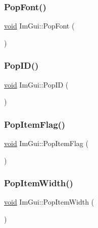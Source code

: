 \mbox{\label{namespaceImGui_af66649bc37022bf3cf2496c73af9a499}} 
\subsubsection{\texorpdfstring{Pop\+Font()}{PopFont()}}
{\footnotesize\ttfamily \hyperlink{imgui__impl__opengl3__loader_8h_ac668e7cffd9e2e9cfee428b9b2f34fa7}{void} Im\+Gui\+::\+Pop\+Font (\begin{DoxyParamCaption}{ }\end{DoxyParamCaption})}

\mbox{\label{namespaceImGui_aba0b2d8f890a5d435ae43d0c4a2d4dd1}} 
\subsubsection{\texorpdfstring{Pop\+I\+D()}{PopID()}}
{\footnotesize\ttfamily \hyperlink{imgui__impl__opengl3__loader_8h_ac668e7cffd9e2e9cfee428b9b2f34fa7}{void} Im\+Gui\+::\+Pop\+ID (\begin{DoxyParamCaption}{ }\end{DoxyParamCaption})}

\mbox{\label{namespaceImGui_aa93281155e1dd23715dbd384e91edc6b}} 
\subsubsection{\texorpdfstring{Pop\+Item\+Flag()}{PopItemFlag()}}
{\footnotesize\ttfamily \hyperlink{imgui__impl__opengl3__loader_8h_ac668e7cffd9e2e9cfee428b9b2f34fa7}{void} Im\+Gui\+::\+Pop\+Item\+Flag (\begin{DoxyParamCaption}{ }\end{DoxyParamCaption})}

\mbox{\label{namespaceImGui_ad29a3fc0cb5dfc7f9fc7224512ce90bf}} 
\subsubsection{\texorpdfstring{Pop\+Item\+Width()}{PopItemWidth()}}
{\footnotesize\ttfamily \hyperlink{imgui__impl__opengl3__loader_8h_ac668e7cffd9e2e9cfee428b9b2f34fa7}{void} Im\+Gui\+::\+Pop\+Item\+Width (\begin{DoxyParamCaption}{ }\end{DoxyParamCaption})}

